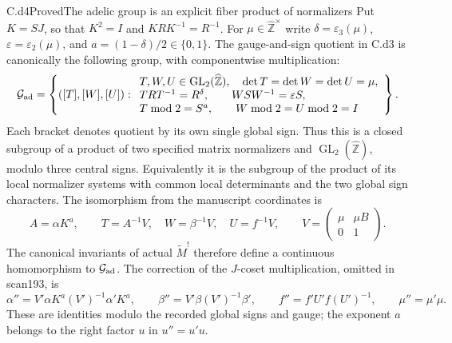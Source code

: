 \begin{claim}{C.d4}{Proved}{The adelic group is an explicit fiber product of normalizers}
Put $K=SJ$, so that $K^2=I$ and $KRK^{-1}=R^{-1}$. For $\mu\in\widehat{\mathbb Z}^{\times}$ write $\delta=\varepsilon_3(\mu)$, $\varepsilon=\varepsilon_2(\mu)$, and $a=(1-\delta)/2\in\{0,1\}$. The gauge-and-sign quotient in C.d3 is canonically the following group, with componentwise multiplication:
\[
 \mathcal G_{\rm ad}=\left\{([T],[W],[U]):
 \begin{array}{l}
 T,W,U\in\operatorname{GL}_2(\widehat{\mathbb Z}),\quad
 \det T=\det W=\det U=\mu,\\
 TRT^{-1}=R^\delta,\qquad WSW^{-1}=\varepsilon S,\\
 T\bmod2=S^a,\qquad W\bmod2=U\bmod2=I
 \end{array}\right\}.
\]
Each bracket denotes quotient by its own single global sign. Thus this is a closed subgroup of a product of two specified matrix normalizers and $\operatorname{GL}_2(\widehat{\mathbb Z})$, modulo three central signs. Equivalently it is the subgroup of the product of its local normalizer systems with common local determinants and the two global sign characters. The isomorphism from the manuscript coordinates is
\[
 A=\alpha K^a,\qquad
 T=A^{-1}V,\quad W=\beta^{-1}V,\quad U=f^{-1}V,
 \qquad V=\begin{pmatrix}\mu&\mu B\\0&1\end{pmatrix}.
\]
The canonical invariants of actual $\widetilde M^!$ therefore define a continuous homomorphism to $\mathcal G_{\rm ad}$. The correction of the $J$-coset multiplication, omitted in scan193, is
\[
 \alpha''=V'\alpha K^a(V')^{-1}\alpha'K^a,\qquad
 \beta''=V'\beta(V')^{-1}\beta',\qquad
 f''=f'U'f(U')^{-1},\qquad\mu''=\mu'\mu.
\]
These are identities modulo the recorded global signs and gauge; the exponent $a$ belongs to the right factor $u$ in $u''=u'u$.
\end{claim}
